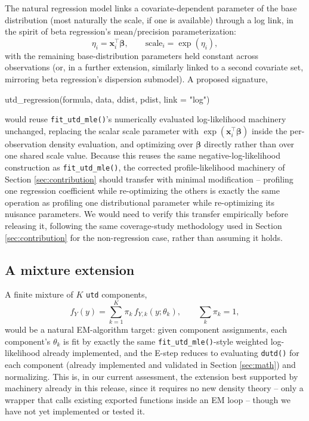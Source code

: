 The natural regression model links a covariate-dependent parameter of
the base distribution (most naturally the scale, if one is available)
through a log link, in the spirit of beta regression's mean/precision
parameterization:
\begin{equation}
  \eta_i = \mathbf{x}_i^\top\boldsymbol\beta, \qquad
  \text{scale}_i = \exp(\eta_i),
\end{equation}
with the remaining base-distribution parameters held constant across
observations (or, in a further extension, similarly linked to a second
covariate set, mirroring beta regression's dispersion submodel). A
proposed signature,
\begin{example}
utd_regression(formula, data, ddist, pdist, link = "log")
\end{example}
would reuse \texttt{fit\_utd\_mle()}'s numerically evaluated
log-likelihood machinery unchanged, replacing the scalar scale
parameter with $\exp(\mathbf{x}_i^\top\boldsymbol\beta)$ inside the
per-observation density evaluation, and optimizing over $\boldsymbol\beta$
directly rather than over one shared scale value. Because this reuses
the same negative-log-likelihood construction as
\texttt{fit\_utd\_mle()}, the corrected profile-likelihood machinery of
Section \ref{sec:contribution} should transfer with minimal
modification -- profiling one regression coefficient while
re-optimizing the others is exactly the same operation as profiling one
distributional parameter while re-optimizing its nuisance parameters.
We would need to verify this transfer empirically before releasing it,
following the same coverage-study methodology used in Section
\ref{sec:contribution} for the non-regression case, rather than assuming it holds.

\subsection{A mixture extension}

A finite mixture of $K$ \texttt{utd} components,
\begin{equation}
  f_Y(y) = \sum_{k=1}^K \pi_k\, f_{Y,k}(y;\theta_k), \qquad \sum_k \pi_k = 1,
\end{equation}
would be a natural EM-algorithm target: given component assignments,
each component's $\theta_k$ is fit by exactly the same
\texttt{fit\_utd\_mle()}-style weighted log-likelihood already
implemented, and the E-step reduces to evaluating \texttt{dutd()} for
each component (already implemented and validated in Section
\ref{sec:math}) and normalizing. This is, in our current assessment,
the extension best supported by machinery already in this release,
since it requires no new density theory -- only a wrapper that calls
existing exported functions inside an EM loop -- though we have not
yet implemented or tested it.


